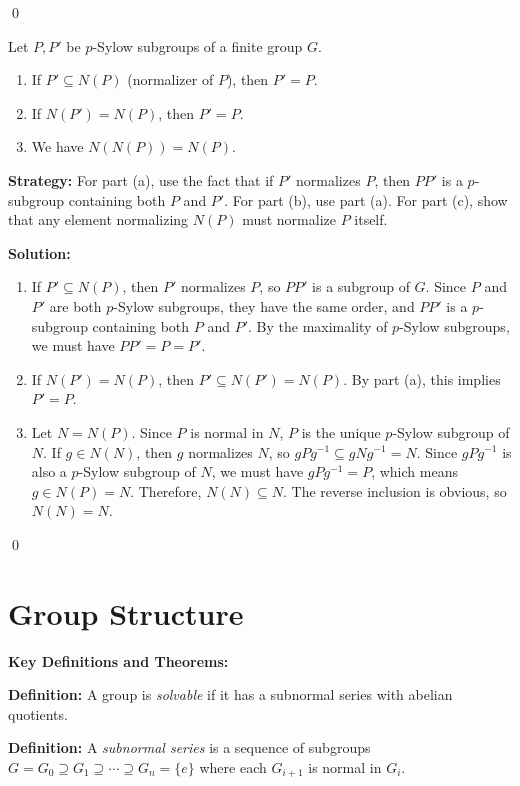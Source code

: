 \qed
\begin{problembox}
Let $P, P'$ be $p$-Sylow subgroups of a finite group $G$.
\begin{enumerate}[label=(\alph*)]
\item If $P' \subseteq N(P)$ (normalizer of $P$), then $P' = P$.
\item If $N(P') = N(P)$, then $P' = P$.
\item We have $N(N(P)) = N(P)$.
\end{enumerate}
\end{problembox}

\noindent\textbf{Strategy:} For part (a), use the fact that if $P'$ normalizes $P$, then $PP'$ is a $p$-subgroup containing both $P$ and $P'$. For part (b), use part (a). For part (c), show that any element normalizing $N(P)$ must normalize $P$ itself.

\noindent\textbf{Solution:}
\begin{enumerate}[label=(\alph*)]
\item If $P' \subseteq N(P)$, then $P'$ normalizes $P$, so $PP'$ is a subgroup of $G$. Since $P$ and $P'$ are both $p$-Sylow subgroups, they have the same order, and $PP'$ is a $p$-subgroup containing both $P$ and $P'$. By the maximality of $p$-Sylow subgroups, we must have $PP' = P = P'$.

\item If $N(P') = N(P)$, then $P' \subseteq N(P') = N(P)$. By part (a), this implies $P' = P$.

\item Let $N = N(P)$. Since $P$ is normal in $N$, $P$ is the unique $p$-Sylow subgroup of $N$. If $g \in N(N)$, then $g$ normalizes $N$, so $gPg^{-1} \subseteq gNg^{-1} = N$. Since $gPg^{-1}$ is also a $p$-Sylow subgroup of $N$, we must have $gPg^{-1} = P$, which means $g \in N(P) = N$. Therefore, $N(N) \subseteq N$. The reverse inclusion is obvious, so $N(N) = N$.
\end{enumerate}


\qed
\section{Group Structure}

\textbf{Key Definitions and Theorems:}

\textbf{Definition:} A group is \textit{solvable} if it has a subnormal series with abelian quotients.

\textbf{Definition:} A \textit{subnormal series} is a sequence of subgroups $G = G_0 \supseteq G_1 \supseteq \cdots \supseteq G_n = \{e\}$ where each $G_{i+1}$ is normal in $G_i$.

